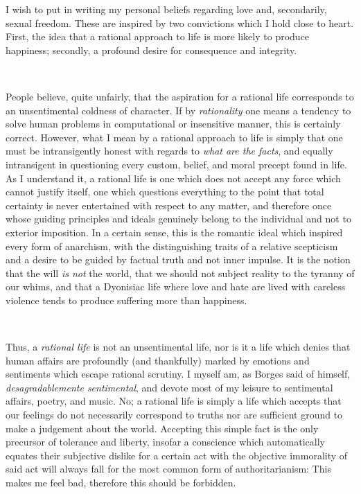 \documentclass[a4paper, 12pt]{article}
\begin{document}
I wish to put in writing my personal beliefs regarding love and, secondarily,
sexual freedom. These are inspired by two convictions which I hold close to
heart. First, the idea that a rational approach to life is more likely to
produce happiness; secondly, a profound desire for consequence and integrity.

~ 

People believe, quite unfairly, that the aspiration for a rational life
corresponds to an unsentimental coldness of character. If by \textit{rationality}
one means a tendency to solve human problems in computational or insensitive
manner, this is certainly correct. However, what I mean by a rational approach
to life is simply that one must be intransigently honest with regards to
\textit{what are the facts}, and equally intransigent in questioning every custom,
belief, and moral precept found in life. As I understand it, a rational life is
one which does not accept any force which cannot justify itself, one which
questions everything to the point that total certainty is never entertained
with respect to any matter, and therefore once whose guiding principles and
ideals genuinely belong to the individual and not to exterior imposition. In a
certain sense, this is the romantic ideal which inspired every form of
anarchism, with the distinguishing traits of a relative scepticism and a desire
to be guided by factual truth and not inner impulse. It is the notion that the
will \textit{is not} the world, that we should not subject reality to the
tyranny of our whims, and that a Dyonisiac life where love and hate are lived
with careless violence tends to produce suffering more than happiness. 

~ 

Thus, a \textit{rational life} is not an unsentimental life, nor is it a life
which denies that human affairs are profoundly (and thankfully) marked by
emotions and sentiments which escape rational scrutiny. I myself am, as Borges
said of himself, \textit{desagradablemente sentimental}, and devote most of
my leisure to sentimental affairs, poetry, and music. No; a rational life is
simply a life which accepts that our feelings do not necessarily correspond to
truths nor are sufficient ground to make a judgement about the world. Accepting
this simple fact is the only precursor of tolerance and liberty, insofar a
conscience which automatically equates their subjective dislike for a certain
act with the objective immorality of said act will always fall for the most
common form of authoritarianism: This makes me feel bad, therefore this should
be forbidden.
\end{document}
